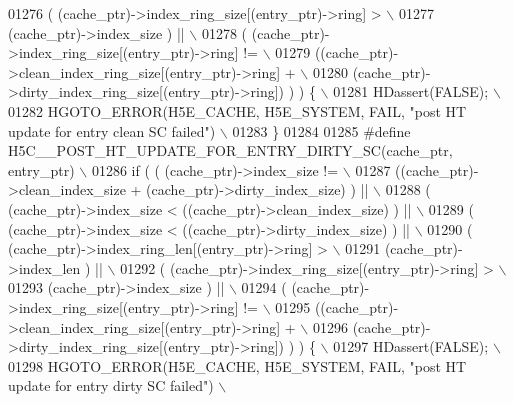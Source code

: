 \begin{DoxyCode}
01276 \textcolor{preprocessor}{     ( (cache\_ptr)->index\_ring\_size[(entry\_ptr)->ring] >                    \(\backslash\)}
01277 \textcolor{preprocessor}{       (cache\_ptr)->index\_size ) ||                                         \(\backslash\)}
01278 \textcolor{preprocessor}{     ( (cache\_ptr)->index\_ring\_size[(entry\_ptr)->ring] !=                   \(\backslash\)}
01279 \textcolor{preprocessor}{       ((cache\_ptr)->clean\_index\_ring\_size[(entry\_ptr)->ring] +             \(\backslash\)}
01280 \textcolor{preprocessor}{        (cache\_ptr)->dirty\_index\_ring\_size[(entry\_ptr)->ring]) ) ) \{        \(\backslash\)}
01281 \textcolor{preprocessor}{    HDassert(FALSE);                                                        \(\backslash\)}
01282 \textcolor{preprocessor}{    HGOTO\_ERROR(H5E\_CACHE, H5E\_SYSTEM, FAIL, "post HT update for entry clean SC failed") \(\backslash\)}
01283 \textcolor{preprocessor}{\}}
01284 
01285 \textcolor{preprocessor}{#define H5C\_\_POST\_HT\_UPDATE\_FOR\_ENTRY\_DIRTY\_SC(cache\_ptr, entry\_ptr)        \(\backslash\)}
01286 \textcolor{preprocessor}{if ( ( (cache\_ptr)->index\_size !=                                           \(\backslash\)}
01287 \textcolor{preprocessor}{       ((cache\_ptr)->clean\_index\_size + (cache\_ptr)->dirty\_index\_size) ) || \(\backslash\)}
01288 \textcolor{preprocessor}{     ( (cache\_ptr)->index\_size < ((cache\_ptr)->clean\_index\_size) ) ||       \(\backslash\)}
01289 \textcolor{preprocessor}{     ( (cache\_ptr)->index\_size < ((cache\_ptr)->dirty\_index\_size) ) ||       \(\backslash\)}
01290 \textcolor{preprocessor}{     ( (cache\_ptr)->index\_ring\_len[(entry\_ptr)->ring] >                     \(\backslash\)}
01291 \textcolor{preprocessor}{       (cache\_ptr)->index\_len ) ||                                          \(\backslash\)}
01292 \textcolor{preprocessor}{     ( (cache\_ptr)->index\_ring\_size[(entry\_ptr)->ring] >                    \(\backslash\)}
01293 \textcolor{preprocessor}{       (cache\_ptr)->index\_size ) ||                                         \(\backslash\)}
01294 \textcolor{preprocessor}{     ( (cache\_ptr)->index\_ring\_size[(entry\_ptr)->ring] !=                   \(\backslash\)}
01295 \textcolor{preprocessor}{       ((cache\_ptr)->clean\_index\_ring\_size[(entry\_ptr)->ring] +             \(\backslash\)}
01296 \textcolor{preprocessor}{        (cache\_ptr)->dirty\_index\_ring\_size[(entry\_ptr)->ring]) ) ) \{        \(\backslash\)}
01297 \textcolor{preprocessor}{    HDassert(FALSE);                                                        \(\backslash\)}
01298 \textcolor{preprocessor}{    HGOTO\_ERROR(H5E\_CACHE, H5E\_SYSTEM, FAIL, "post HT update for entry dirty SC failed") \(\backslash\)}

\end{DoxyCode}
